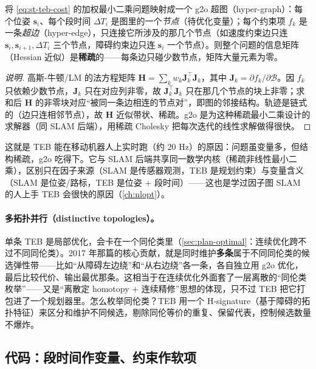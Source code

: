 \begin{theorem}\label{thm:st-teb-sparse}
将 \cref{eq:st-teb-cost} 的加权最小二乘问题映射成一个 g2o 超图（hyper-graph）：每个位姿 $\mathbf s_i$、每个段时间 $\Delta T_i$ 是图里的一个\emph{节点}（待优化变量）；每个约束项 $f_k$ 是一条\emph{超边}（hyper-edge），只连接它所涉及的那几个节点（如速度约束边只连 $\mathbf s_i,\mathbf s_{i+1},\Delta T_i$ 三个节点，障碍约束边只连 $\mathbf s_i$ 一个节点）。则整个问题的信息矩阵（Hessian 近似）是\textbf{稀疏}的——每条边只碰少数节点，矩阵大量元素为零。
\end{theorem}
\begin{proof}[说明]
高斯-牛顿/LM 的法方程矩阵 $\mathbf H=\sum_k w_k\mathbf J_k^\top\mathbf J_k$，其中 $\mathbf J_k=\partial f_k/\partial\mathcal B$。因 $f_k$ 只依赖少数节点，$\mathbf J_k$ 只在对应列非零，故 $\mathbf J_k^\top\mathbf J_k$ 只在那几个节点的块上非零；求和后 $\mathbf H$ 的非零块对应“被同一条边相连的节点对”，即图的邻接结构。轨迹是链式的（边只连相邻节点），故 $\mathbf H$ 近似带状、稀疏。g2o 是为这种稀疏最小二乘设计的求解器（同 SLAM 后端），用稀疏 Cholesky 把每次迭代的线性求解做得很快。
\end{proof}

\noindent 这就是 TEB 能在移动机器人上实时跑（约 $20$ Hz）的原因：问题虽变量多，但结构稀疏，g2o 吃得下。它与 SLAM 后端共享同一数学内核（稀疏非线性最小二乘），区别只在因子来源（SLAM 是传感器观测，TEB 是规划约束）与变量含义（SLAM 是位姿/路标，TEB 是位姿 + 段时间）——这也是学过因子图 SLAM 的人上手 TEB 会很快的原因（\cref{ch:nlopt}）。

\paragraph{多拓扑并行（distinctive topologies）。}
单条 TEB 是局部优化，会卡在一个同伦类里（\cref{sec:plan-optimal}：连续优化跨不过不同同伦类）。2017 年那篇的核心贡献，就是同时维护\textbf{多条}属于不同同伦类的候选弹性带——比如“从障碍左边绕”和“从右边绕”各一条，各自独立用 g2o 优化，最后比较代价、输出最优那条\cite{rosmann2017teb}。这相当于在连续优化外面套了一层离散的“同伦类枚举”——又是“离散定 homotopy + 连续精修”思想的体现，只不过 TEB 把它打包进了一个规划器里。怎么枚举同伦类？TEB 用一个 H-signature（基于障碍的拓扑特征）来区分和维护不同候选，剔除同伦等价的重复、保留代表，控制候选数量不爆炸。

\subsection{代码：段时间作变量、约束作软项}
\label{sec:st-teb-code}

